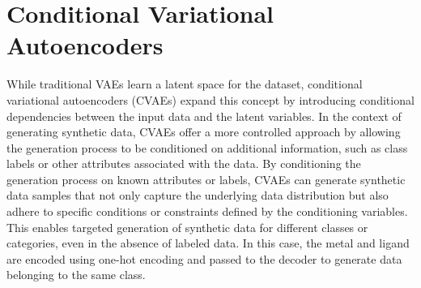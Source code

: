 \section{Conditional Variational Autoencoders}
While traditional VAEs learn a latent space for the dataset, conditional variational autoencoders (CVAEs) expand this concept by introducing conditional dependencies between the input data and the latent variables. In the context of generating synthetic data, CVAEs offer a more controlled approach by allowing the generation process to be conditioned on additional information, such as class labels or other attributes associated with the data.
By conditioning the generation process on known attributes or labels, CVAEs can generate synthetic data samples that not only capture the underlying data distribution but also adhere to specific conditions or constraints defined by the conditioning variables. This enables targeted generation of synthetic data for different classes or categories, even in the absence of labeled data. In this case, the metal and ligand are encoded using one-hot encoding and passed to the decoder to generate data belonging to the same class. 

